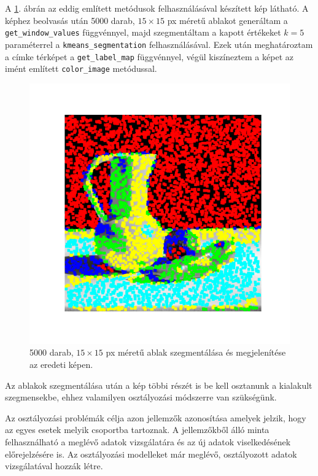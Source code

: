 A \ref{fig:window_colorized}. ábrán az eddig említett metódusok felhasználásával készített kép látható. A képhez beolvasás után 5000 darab, $15\times15$ px méretű ablakot generáltam a \texttt{get\_window\_values} függvénnyel, majd szegmentáltam a kapott értékeket $k=5$ paraméterrel a \texttt{kmeans\_segmentation} felhasználásával. Ezek után meghatároztam a címke térképet a \texttt{get\_label\_map} függvénnyel, végül kiszíneztem a képet az imént említett \texttt{color\_image} metódussal.

\begin{figure}[h]
\centering
\includegraphics[scale=0.6]{images/window_colorized.png}
\caption{5000 darab, $15 \times 15$ px méretű ablak szegmentálása és megjelenítése az eredeti képen.}
\label{fig:window_colorized}
\end{figure}

Az ablakok szegmentálása után a kép többi részét is be kell osztanunk a kialakult szegmensekbe, ehhez valamilyen osztályozási módszerre van szükségünk.


Az osztályozási problémák célja azon jellemzők azonosítása amelyek jelzik, hogy az egyes esetek melyik csoportba tartoznak. A jellemzőkből álló minta felhasználható a meglévő adatok vizsgálatára és az új adatok viselkedésének előrejelzésére is. Az osztályozási modelleket már meglévő, osztályozott adatok vizsgálatával hozzák létre.

